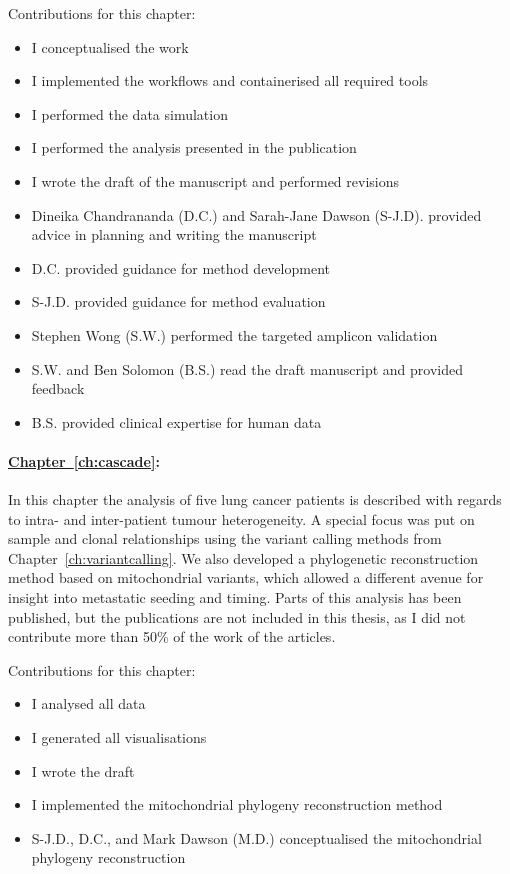 {Contributions for this chapter:
\begin{itemize}
	\item I conceptualised the work
	\item I implemented the workflows and containerised all required tools
	\item I performed the data simulation
	\item I performed the analysis presented in the publication
	
	\item I wrote the draft of the manuscript and performed revisions
	\item Dineika Chandrananda (D.C.) and Sarah-Jane Dawson (S-J.D). provided advice in planning and writing the manuscript
	\item D.C. provided guidance for method development
	\item S-J.D. provided guidance for method evaluation
	\item Stephen Wong (S.W.) performed the targeted amplicon validation
	\item S.W. and  Ben Solomon (B.S.) read the draft manuscript and provided feedback
	\item B.S. provided clinical expertise for human data
	
\end{itemize}



\paragraph*{\hyperref[ch:cascade]{Chapter~\ref*{ch:cascade}}:} 
In this chapter the analysis of five lung cancer patients is described with regards to intra- and inter-patient tumour heterogeneity. A special focus was put on sample and clonal relationships using the variant calling methods from Chapter~\ref*{ch:variantcalling}. We also developed a phylogenetic reconstruction method based on mitochondrial variants, which allowed a different avenue for insight into metastatic seeding and timing. Parts of this analysis has been published\cite{Burr2019,Solomon2020}, but the publications are not included in this thesis, as I did not contribute more than 50\% of the work of the articles. 


Contributions for this chapter:
\begin{itemize}
	\item I analysed all data
	\item I generated all visualisations
	\item I wrote the draft
	\item I implemented the mitochondrial phylogeny reconstruction method
	\item S-J.D., D.C., and Mark Dawson (M.D.) conceptualised the mitochondrial phylogeny reconstruction
	

\end{itemize}}
